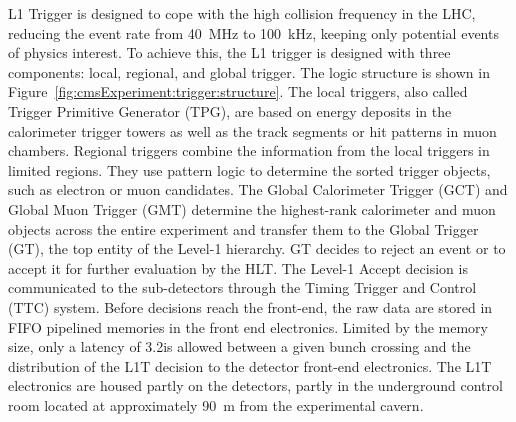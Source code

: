 L1 Trigger is designed to cope with the high collision frequency in the LHC, reducing the event rate from 40~MHz to 100~kHz, keeping only potential events of physics interest. To achieve this, the L1 trigger is designed with three components: local, regional, and global trigger. The logic structure is shown in Figure~\ref{fig:cmsExperiment:trigger:structure}. The local triggers, also called Trigger Primitive Generator (TPG), are based on energy deposits in the calorimeter trigger towers as well as the track segments or hit patterns in muon chambers. Regional triggers combine the information from the local triggers in limited regions. They use pattern logic to determine the sorted trigger objects, such as electron or muon candidates. The  Global Calorimeter Trigger (GCT) and Global Muon Trigger (GMT) determine the highest-rank calorimeter and muon objects across the entire experiment and transfer them to the Global Trigger (GT), the top entity of the Level-1 hierarchy. GT decides to reject an event or to accept it for further evaluation by the HLT. The Level-1 Accept decision is communicated to the sub-detectors through the  Timing Trigger and Control (TTC) system. Before decisions reach the front-end, the raw data are stored in FIFO pipelined memories in the front end electronics. Limited by the memory size, only a latency of 3.2\mus is allowed between a given bunch crossing and the distribution of the L1T decision to the detector front-end electronics. The L1T electronics are housed partly on the detectors, partly in the underground control room located at approximately 90~m from the experimental cavern.


    

